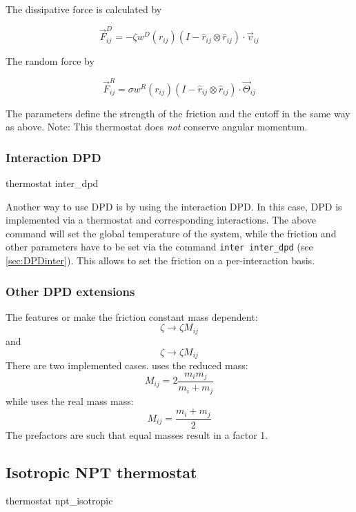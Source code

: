 The dissipative force is calculated by

$$ \vec{F}_{ij}^{D} = -\zeta w^D (r_{ij}) (I-\hat{r}_{ij}\otimes\hat{r}_{ij}) \cdot \vec{v}_{ij}$$

The random force by

$$ \vec{F}_{ij}^R = \sigma w^R (r_{ij}) (I-\hat{r}_{ij}\otimes\hat{r}_{ij}) \cdot \vec{\Theta}_{ij}$$

The parameters   define the strength of the
friction and the cutoff in the same way as above.  Note: This
thermostat does \emph{not} conserve angular momentum.

\subsubsection{Interaction DPD}\label{sec:interDPD}

\begin{essyntax}
  thermostat inter_dpd 
  \begin{features}
  \end{features}
\end{essyntax}

Another way to use DPD is by using the interaction DPD. In this case,
DPD is implemented via a thermostat and corresponding interactions.
The above command will set the global temperature of the system, while
the friction and other parameters have to be set via the command
\texttt{inter inter_dpd} (see \vref{sec:DPDinter}).  This allows to
set the friction on a per-interaction basis.

\subsubsection{Other DPD extensions}
The features  or  make the
friction constant mass dependent:
$$ \zeta \to \zeta M_{ij} $$ 
and 
$$ \zeta \to \zeta M_{ij} $$
There are two implemented cases.  uses the
reduced mass:
$$ M_{ij}=2\frac{m_i m_j}{m_i+m_j} $$
while  uses the real mass mass:
$$ M_{ij}=\frac{m_i+m_j}{2} $$
The prefactors are such that equal masses result in a factor 1.

\subsection{Isotropic NPT thermostat}
\label{ssec:NPTthermostat}
\begin{essyntax}
  thermostat npt_isotropic   
  \begin{features}
  \end{features}
\end{essyntax}

